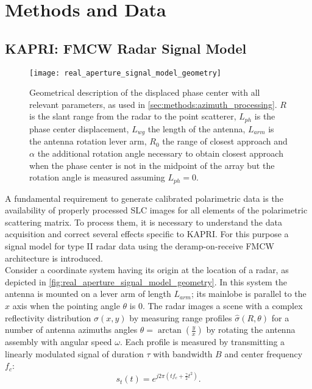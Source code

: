 \section{Methods and Data}\label{sec:methods}
\subsection{KAPRI: FMCW Radar Signal Model}\label{sec:methods:signal_model}
\begin{figure*}[ht!]
	\centering
	\texttt{[image: real\_aperture\_signal\_model\_geometry]}
	\caption{Geometrical description of the displaced phase center with all relevant parameters, as used in \autoref{sec:methods:azimuth_processing}. $R$ is the slant range from the radar to the point scatterer, $L_{ph}$ is the phase center displacement, $L_{wg}$ the length of the antenna, $L_{arm}$ is the antenna rotation lever arm, $R_{0}$ the range of closest approach and $\alpha$ the additional rotation angle necessary to obtain closest approach when the phase center is not in the midpoint of the array but the rotation angle is measured assuming $L_{ph}=0$.}
	\label{fig:real_aperture_signal_model_geometry}
\end{figure*}
A fundamental requirement to generate calibrated polarimetric data is the availability of properly processed SLC images for all elements of the polarimetric scattering matrix. To process them, it is necessary to understand the data acquisition and correct several effects specific to KAPRI.  
For this purpose a signal model for type II\cite{Caduff2015} radar data using the deramp-on-receive FMCW architecture\cite{Stove1992} is introduced.\\
Consider a coordinate system having its origin at the location of a radar, as depicted in \autoref{fig:real_aperture_signal_model_geometry}. In this system the antenna is mounted on a lever arm of length $L_{arm}$; its mainlobe is parallel to the $x$ axis when the pointing angle $\theta$ is 0. The radar images a scene with a complex reflectivity distribution $\sigma\left(x,y\right)$ by measuring range profiles $\hat{\sigma}\left(R, \theta\right)$ for a number of antenna azimuths angles $\theta = \operatorname{arctan}\left(\frac{y}{x}\right)$ by rotating the antenna assembly with angular speed $\omega$. Each profile is measured by transmitting a linearly modulated signal of duration $\tau$ with bandwidth $B$ and center frequency $f_c$:
\begin{equation}
	s_t\left(t\right) = e^{j 2 \pi \left( t f_{c} + \frac{\gamma}{2} t^2 \right)}.
\end{equation}

